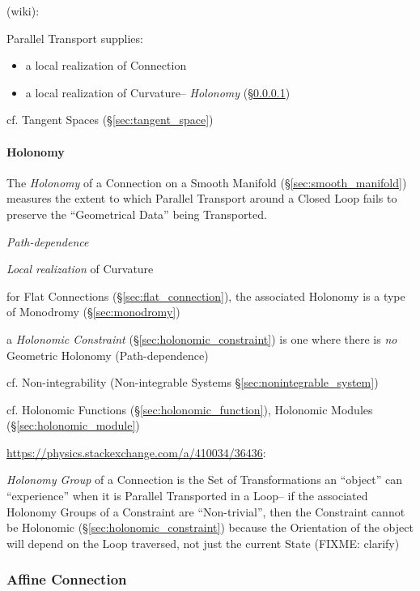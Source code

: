 (wiki):

Parallel Transport supplies:
\begin{itemize}
  \item a local realization of Connection
  \item a local realization of Curvature-- \emph{Holonomy}
    (\S\ref{sec:holonomy})
\end{itemize}

\fist cf. Tangent Spaces (\S\ref{sec:tangent_space})



\paragraph{Holonomy}\label{sec:holonomy}\hfill

The \emph{Holonomy} of a Connection on a Smooth Manifold
(\S\ref{sec:smooth_manifold}) measures the extent to which Parallel Transport
around a Closed Loop fails to preserve the ``Geometrical Data'' being
Transported.

\emph{Path-dependence}

\emph{Local realization} of Curvature

for Flat Connections (\S\ref{sec:flat_connection}), the associated Holonomy is
a type of Monodromy (\S\ref{sec:monodromy})

a \emph{Holonomic Constraint} (\S\ref{sec:holonomic_constraint}) is one where
there is \emph{no} Geometric Holonomy (Path-dependence)

cf. Non-integrability (Non-integrable Systems \S\ref{sec:nonintegrable_system})

\fist cf. Holonomic Functions (\S\ref{sec:holonomic_function}), Holonomic
Modules (\S\ref{sec:holonomic_module})

\url{https://physics.stackexchange.com/a/410034/36436}:

\emph{Holonomy Group} of a Connection is the Set of Transformations an
``object'' can ``experience'' when it is Parallel Transported in a Loop-- if
the associated Holonomy Groups of a Constraint are ``Non-trivial'', then the
Constraint cannot be Holonomic (\S\ref{sec:holonomic_constraint}) because the
Orientation of the object will depend on the Loop traversed, not just the
current State (FIXME: clarify)



\subsubsection{Affine Connection}\label{sec:affine_connection}


